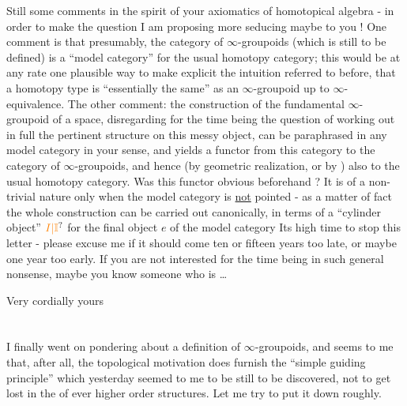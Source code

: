 Still some comments in the spirit of your axiomatics of homotopical algebra - in order to make the question I am proposing more seducing maybe to you ! One comment is that presumably, the category of $\infty$-groupoids (which is still to be defined) is a ``model category'' for the usual homotopy category; this would be at any rate one plausible way to make explicit the intuition referred to before, that a homotopy type is ``essentially the same'' as an $\infty$-groupoid up to $\infty$-equivalence. The other comment: the construction of the fundamental $\infty$-groupoid of a space, disregarding for the time being the question of working out in full the pertinent structure on this messy object, can be paraphrased in any model category in your sense, and yields a functor from this category to the category of $\infty$-groupoids, and hence (by geometric realization, or by ) also to the usual homotopy category. Was this functor obvious beforehand ? It is of a non-trivial nature only when the model category is \uline{not} pointed - as a matter of fact the whole construction can be carried out canonically, in terms of a ``cylinder object'' $\unsure{I|\mathbb{I}}$ for the final object $e$ of the model category
Its high time to stop this letter - please excuse me if it should come ten or fifteen years too late, or maybe one year too early. If you are not interested for the time being in such general nonsense, maybe you know someone who is \ldots

Very cordially yours\\
\\
\hfill{}\\
I finally went on pondering about a definition of $\infty$-groupoids, and  seems to me that, after all, the topological motivation does furnish the ``simple guiding principle'' which yesterday seemed to me to be still to be discovered,  not to get lost in the  of ever higher order structures. Let me try to put it down roughly.

